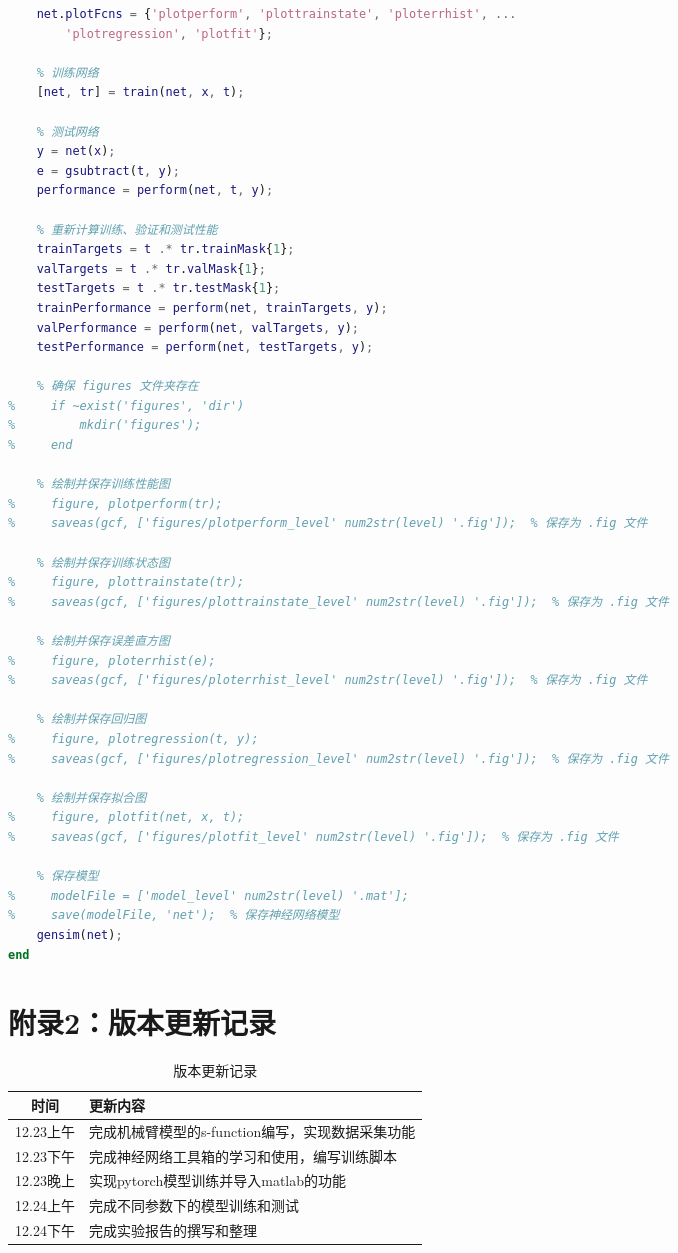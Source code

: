 \documentclass[12pt,a4paper,UTF8]{article}
\begin{document}
\begin{lstlisting}[language=Matlab,caption=train.m——使用matlab训练模型的脚本]
    % 选择绘图函数
    net.plotFcns = {'plotperform', 'plottrainstate', 'ploterrhist', ...
        'plotregression', 'plotfit'};

    % 训练网络
    [net, tr] = train(net, x, t);

    % 测试网络
    y = net(x);
    e = gsubtract(t, y);
    performance = perform(net, t, y);

    % 重新计算训练、验证和测试性能
    trainTargets = t .* tr.trainMask{1};
    valTargets = t .* tr.valMask{1};
    testTargets = t .* tr.testMask{1};
    trainPerformance = perform(net, trainTargets, y);
    valPerformance = perform(net, valTargets, y);
    testPerformance = perform(net, testTargets, y);

    % 确保 figures 文件夹存在
%     if ~exist('figures', 'dir')
%         mkdir('figures');
%     end

    % 绘制并保存训练性能图
%     figure, plotperform(tr);
%     saveas(gcf, ['figures/plotperform_level' num2str(level) '.fig']);  % 保存为 .fig 文件

    % 绘制并保存训练状态图
%     figure, plottrainstate(tr);
%     saveas(gcf, ['figures/plottrainstate_level' num2str(level) '.fig']);  % 保存为 .fig 文件

    % 绘制并保存误差直方图
%     figure, ploterrhist(e);
%     saveas(gcf, ['figures/ploterrhist_level' num2str(level) '.fig']);  % 保存为 .fig 文件

    % 绘制并保存回归图
%     figure, plotregression(t, y);
%     saveas(gcf, ['figures/plotregression_level' num2str(level) '.fig']);  % 保存为 .fig 文件

    % 绘制并保存拟合图
%     figure, plotfit(net, x, t);
%     saveas(gcf, ['figures/plotfit_level' num2str(level) '.fig']);  % 保存为 .fig 文件

    % 保存模型
%     modelFile = ['model_level' num2str(level) '.mat'];
%     save(modelFile, 'net');  % 保存神经网络模型
    gensim(net);
end
\end{lstlisting}

\section{附录2：版本更新记录}


\begin{table}[htbp]
\centering
\caption{版本更新记录}
\begin{tabular}{|c|l|}
\hline
时间 & 更新内容 \\
\hline
12.23上午 & 完成机械臂模型的s-function编写，实现数据采集功能 \\
\hline
12.23下午 & 完成神经网络工具箱的学习和使用，编写训练脚本 \\
\hline
12.23晚上 & 实现pytorch模型训练并导入matlab的功能 \\
\hline
12.24上午 & 完成不同参数下的模型训练和测试 \\
\hline
12.24下午 & 完成实验报告的撰写和整理 \\
\hline
\end{tabular}
\end{table}

\end{document}
